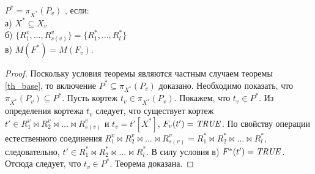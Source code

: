 \author{Мосин Сергей, Зыкин Сергей}
\begin{theorem}
$P^{\ast} = \pi_{X^{\ast}} (P_{v})$
, если: 
\\а) $X^{\ast} \subseteq X_{v}$
\\б) 
$\{R^{v}_{1}, \ldots, R^{v}_{s(v)}\} = \{R^{\ast}_{1}, \ldots, R^{\ast}_{l}\}$
\\в) $M (F^{\ast}) = M (F_{v}) $.
\label{th_base_eq}
\end{theorem} 
\begin{proof}
Поскольку условия теоремы являются частным случаем теоремы \ref{th_base}, то
включение $P^{\ast} \subseteq \pi_{X^{\ast}} (P_{v})$
доказано. Необходимо показать, что
$\pi_{X^{\ast}} (P_{v}) \subseteq P^{\ast}$. Пусть
кортеж $t_v \in \pi_{X^{\ast}} (P_{v})$. Покажем, что
$t_v \in P^{\ast}$. Из определения кортежа $t_v$ следует, что существует кортеж  $t' \in R^v_1 \bowtie R^v_2\bowtie\ldots \bowtie R^v_{s(v)}$ и $t_v = t'[X^{\ast}]$, $F_v(t')=\mathit{TRUE}$. По свойству операции естественного соединения $R^v_1 \bowtie R^v_2\bowtie\ldots \bowtie R^v_{s(v)} = R^{\ast}_1 \bowtie R^{\ast}_2\bowtie\ldots \bowtie R^{\ast}_l$, следовательно, $t' \in R^{\ast}_1 \bowtie R^{\ast}_2\bowtie\ldots \bowtie R^{\ast}_l$. В силу условия в) $F^{\ast} (t')=\mathit{TRUE}$. Отсюда следует, что $t_v \in P^{\ast}$. Теорема доказана.
\end{proof}

